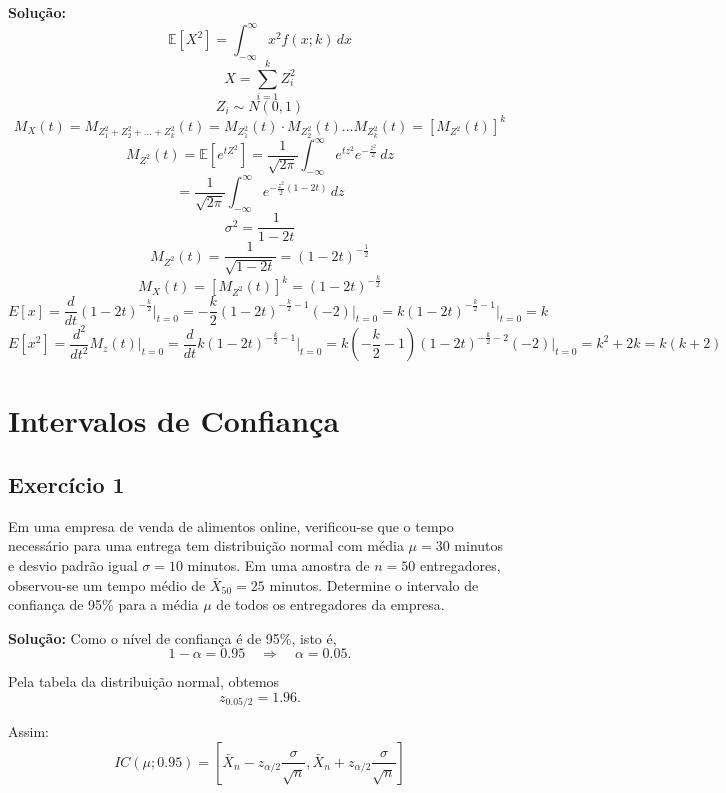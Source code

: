 \documentclass{article}
\begin{document}
\vspace{0.5cm}
\textbf{Solução:} 
    $$
    \mathbb{E}[X^2] = \int_{-\infty}^{\infty} x^2 f(x; k) \, dx
    $$
    $$
    X = \sum_{i=1}^k Z_i^2
    $$
    $$
    Z_i \sim N(0,1)
    $$
    $$
    M_X(t) = M_{Z_1^2 + Z_2^2 + \dots + Z_k^2}(t) = M_{Z_1^2}(t) \cdot M_{Z_2^2}(t) \dots M_{Z_k^2}(t) = [ M_{Z^2}(t) ]^k
    $$
    $$
    M_{Z^2}(t) = \mathbb{E} \left[ e^{t Z^2} \right] = \frac{1}{\sqrt{2\pi}} \int_{-\infty}^{\infty} e^{t z^2} e^{-\frac{z^2}{2}} \, dz
    $$
    $$
    = \frac{1}{\sqrt{2\pi}} \int_{-\infty}^{\infty} e^{ -\frac{z^2}{2} (1 - 2t)} \, dz
    $$
    $$
    \sigma^2 
    = \frac{1}{1-2t}
    $$
    $$
    M_{Z^2}(t) 
    = \frac{1}{\sqrt{1-2t}}
    = (1-2t)^{-\frac{1}{2}}
    $$
    $$
    M_X(t) 
    = [M_{Z^2}(t)]^k
    = (1-2t)^{-\frac{k}{2}}
    $$
    $$
    E[x] = \frac{d}{dt} (1 - 2t)^{-\frac{k}{2}} \bigg|_{t=0} 
    = -\frac{k}{2} (1 - 2t)^{-\frac{k}{2}-1}(-2) \bigg|_{t=0} 
    = k (1 - 2t)^{-\frac{k}{2}-1} \bigg|_{t=0} 
    = k
    $$
    $$
    E[x^2] = \frac{d^2}{dt^2} M_z(t) \bigg|_{t=0}
    = \frac{d}{dt} k (1 - 2t)^{-\frac{k}{2}-1} \bigg|_{t=0}
    = k \left(-\frac{k}{2} - 1\right) (1 - 2t)^{-\frac{k}{2}-2}(-2) \bigg|_{t=0}
    = k^2 + 2k = k(k+2)
    $$

\section{Intervalos de Confiança}
\subsection{Exercício 1}
Em uma empresa de venda de alimentos online, verificou-se que o tempo necessário para uma entrega tem distribuição normal com média $\mu = 30$ minutos e desvio padrão igual $\sigma = 10$ minutos. 
Em uma amostra de $n = 50$ entregadores, observou-se um tempo médio de $\bar{X}_{50} = 25$ minutos. 
Determine o intervalo de confiança de 95\% para a média $\mu$ de todos os entregadores da empresa.

\vspace{0.5cm}
\textbf{Solução:}
Como o nível de confiança é de 95\%, isto é,
    $$
    1 - \alpha = 0.95 \quad \Rightarrow \quad \alpha = 0.05.
    $$

Pela tabela da distribuição normal, obtemos
    $$
    z_{0.05/2} = 1.96.
    $$

Assim:
    $$
    IC(\mu; 0.95) =
    \left[
    \bar{X}_n - z_{\alpha/2}\frac{\sigma}{\sqrt{n}},
    \bar{X}_n + z_{\alpha/2}\frac{\sigma}{\sqrt{n}}
    \right]
    $$
\end{document}
